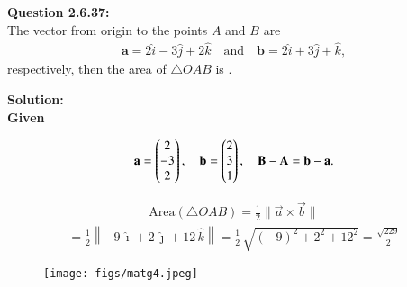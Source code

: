 \documentclass[journal]{IEEEtran}
\begin{document}



\textbf{Question 2.6.37:} \\
The vector from origin to the points $A$ and $B$ are \begin{align}
\mathbf{a} = 2\hat{i} - 3\hat{j} + 2\hat{k} \quad \text{and} 
 \quad \mathbf{b} = 2\hat{i} + 3\hat{j} + \hat{k},
 \end{align}respectively, then the area of $\triangle OAB$ is \underline{\hspace{2cm}}.

\textbf{Solution:}\\
 \textbf{Given}  

\begin{align}
\mathbf a = \begin{pmatrix}2\\-3\\2\end{pmatrix},\quad
\mathbf b = \begin{pmatrix}2\\3\\1\end{pmatrix},\quad
\mathbf{B} - \mathbf{A} = \mathbf b - \mathbf a.
\end{align}

\begin{align}
\text{Area}(\triangle OAB)
= \frac{1}{2} \bigl\| \vec a \times \vec b \bigr\|
\end{align}
\begin{align}
= \frac{1}{2}
\left\|
-9\,\hat\imath + 2\,\hat\jmath + 12\,\hat k
\right\|
= \frac{1}{2}\,\sqrt{(-9)^2 + 2^2 + 12^2}
= \frac{\sqrt{229}}{2}
\end{align}
\newpage
\begin{figure}
    \centering
\texttt{[image: figs/matg4.jpeg]}
    \caption{}
    \label{fig:placeholder}
\end{figure}
\end{document}
